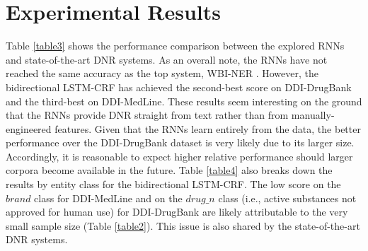 \section{Experimental Results}
\label{sec:experiment-results}

Table \ref{table3} shows the performance comparison between the explored RNNs and state-of-the-art DNR systems. As an overall note, the RNNs have not reached the same accuracy as the top system, WBI-NER \cite{huber2013wbi}. However, the bidirectional LSTM-CRF has achieved the second-best score on DDI-DrugBank and the third-best on DDI-MedLine. These results seem interesting on the ground that the RNNs provide DNR straight from text rather than from manually-engineered features. Given that the RNNs learn entirely from the data, the better performance over the DDI-DrugBank dataset is very likely due to its larger size. Accordingly, it is reasonable to expect higher relative performance should larger corpora become available in the future. Table \ref{table4} also breaks down the results by entity class for the bidirectional LSTM-CRF. The low score on the $brand$ class for DDI-MedLine and on the $drug\_n$ class (i.e., active substances not approved for human use) for DDI-DrugBank  are likely attributable to the very small sample size (Table \ref{table2}). This issue is also shared by the state-of-the-art DNR systems.
